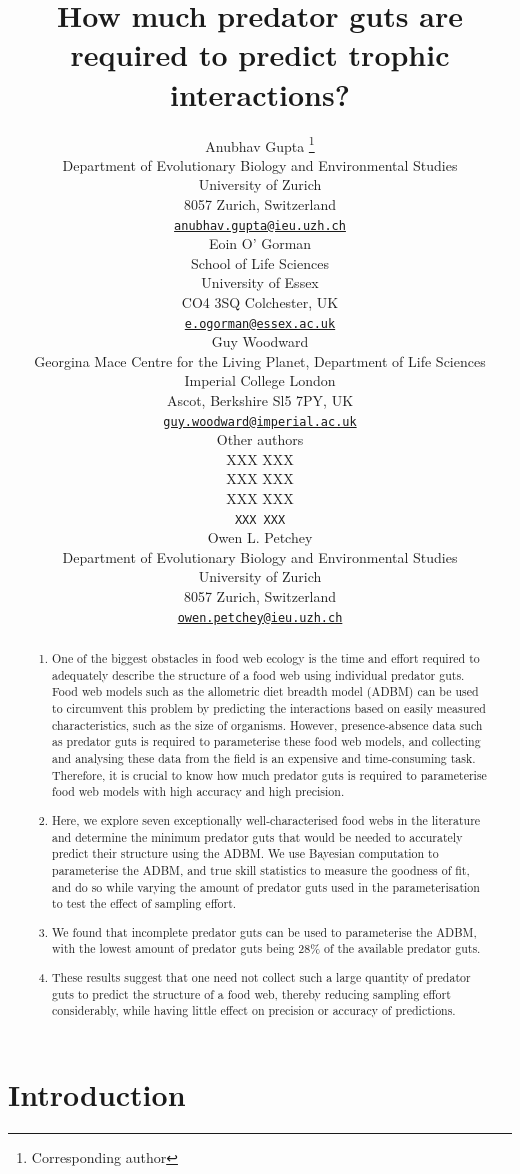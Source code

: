 \documentclass{article}
\title{How much predator guts are required to predict trophic
interactions?}
\author{
    Anubhav Gupta
    \thanks{Corresponding author}
   \\
    Department of Evolutionary Biology and Environmental Studies \\
    University of Zurich \\
  8057 Zurich, Switzerland \\
  \texttt{\href{mailto:anubhav.gupta@ieu.uzh.ch}{\nolinkurl{anubhav.gupta@ieu.uzh.ch}}} \\
   \And
    Eoin O' Gorman
   \\
    School of Life Sciences \\
    University of Essex \\
  CO4 3SQ Colchester, UK \\
  \texttt{\href{mailto:e.ogorman@essex.ac.uk}{\nolinkurl{e.ogorman@essex.ac.uk}}} \\
   \And
    Guy Woodward
   \\
    Georgina Mace Centre for the Living Planet, Department of Life
Sciences \\
    Imperial College London \\
  Ascot, Berkshire Sl5 7PY, UK \\
  \texttt{\href{mailto:guy.woodward@imperial.ac.uk}{\nolinkurl{guy.woodward@imperial.ac.uk}}} \\
   \And
    Other authors
   \\
    XXX XXX \\
    XXX XXX \\
  XXX XXX \\
  \texttt{XXX XXX} \\
   \And
    Owen L. Petchey
   \\
    Department of Evolutionary Biology and Environmental Studies \\
    University of Zurich \\
  8057 Zurich, Switzerland \\
  \texttt{\href{mailto:owen.petchey@ieu.uzh.ch}{\nolinkurl{owen.petchey@ieu.uzh.ch}}} \\
  }
\providecommand{\tightlist}{%
  \setlength{\itemsep}{0pt}\setlength{\parskip}{0pt}}
\begin{document}
\maketitle


\begin{abstract}
\begin{enumerate}
\def\labelenumi{\arabic{enumi})}
\tightlist
\item
  One of the biggest obstacles in food web ecology is the time and
  effort required to adequately describe the structure of a food web
  using individual predator guts. Food web models such as the allometric
  diet breadth model (ADBM) can be used to circumvent this problem by
  predicting the interactions based on easily measured characteristics,
  such as the size of organisms. However, presence-absence data such as
  predator guts is required to parameterise these food web models, and
  collecting and analysing these data from the field is an expensive and
  time-consuming task. Therefore, it is crucial to know how much
  predator guts is required to parameterise food web models with high
  accuracy and high precision.
\item
  Here, we explore seven exceptionally well-characterised food webs in
  the literature and determine the minimum predator guts that would be
  needed to accurately predict their structure using the ADBM. We use
  Bayesian computation to parameterise the ADBM, and true skill
  statistics to measure the goodness of fit, and do so while varying the
  amount of predator guts used in the parameterisation to test the
  effect of sampling effort.
\item
  We found that incomplete predator guts can be used to parameterise the
  ADBM, with the lowest amount of predator guts being 28\% of the
  available predator guts.
\item
  These results suggest that one need not collect such a large quantity
  of predator guts to predict the structure of a food web, thereby
  reducing sampling effort considerably, while having little effect on
  precision or accuracy of predictions.
\end{enumerate}
\end{abstract}


\hypertarget{introduction}{%
\section{Introduction}\label{introduction}}
\end{document}
